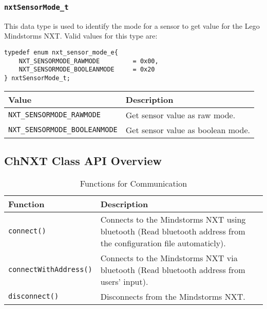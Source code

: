 \subsubsection{\label{sec:nxtSensorMode_t}\texttt{nxtSensorMode\_t}}
This data type is used to identify the mode for a sensor to get value for the Lego Mindstorms NXT. Valid values for this type are:

\begin{verbatim}
typedef enum nxt_sensor_mode_e{
    NXT_SENSORMODE_RAWMODE         = 0x00,
    NXT_SENSORMODE_BOOLEANMODE     = 0x20
} nxtSensorMode_t;
\end{verbatim}


\noindent
\begin{tabular}{p{5.5cm}p{10cm}} \hline
Value & Description\\
\hline
\texttt{NXT\_SENSORMODE\_RAWMODE}	    &Get sensor value as raw mode.\\	 
\texttt{NXT\_SENSORMODE\_BOOLEANMODE}  &Get sensor value as boolean mode.\\
\hline
\end{tabular}


\subsection{ChNXT Class API Overview}
\begin{table}[!h]
\caption{Functions for Communication}

\begin{tabular}{ p{6cm}p{10cm}}\hline
Function & Description\\
\hline
\texttt{connect()}&Connects to the Mindstorms NXT using bluetooth 
(Read bluetooth address from the configuration file automaticly).\\
\texttt{connectWithAddress()}&Connects to the Mindstorms NXT via 
bluetooth (Read bluetooth address from users' input).\\
\texttt{disconnect()}  &Disconnects from the Mindstorms NXT.\\
\hline
\end{tabular}
\end{table}

